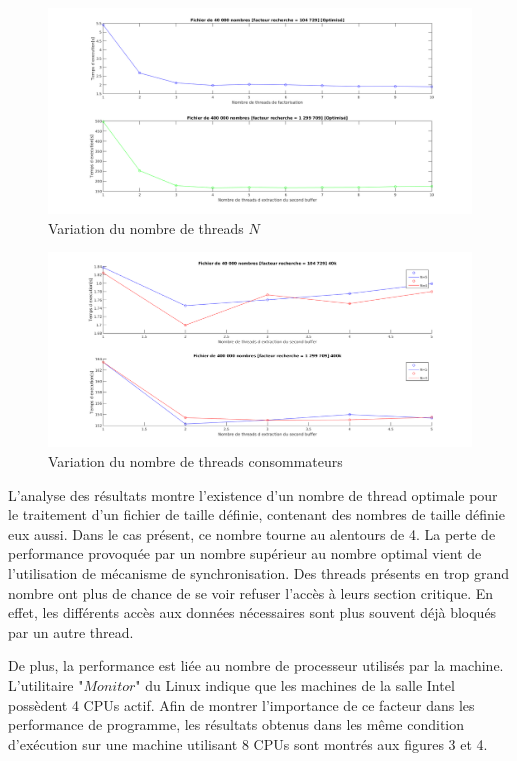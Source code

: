 \documentclass[11pt,a4paper]{article}
\begin{document}
\begin{figure}[ht!]
 \centering
 \includegraphics[scale=0.4]{NanaOpt.png}
 \caption{Variation du nombre de threads $N$}
 \label{schemefig1}
\end{figure}

\begin{figure}[ht!]
 \centering
 \begin{center}
 \includegraphics[scale=0.4]{kanaOpt.png} 
 \end{center}
 \caption{Variation du nombre de threads consommateurs}
 \label{scheme1}
\end{figure}

L'analyse des résultats montre l'existence d'un nombre de thread optimale pour le traitement d'un fichier de taille définie, contenant des nombres de taille définie eux aussi. Dans le cas présent, ce nombre tourne au alentours de 4. La perte de performance provoquée par un nombre supérieur au nombre optimal vient de l'utilisation de mécanisme de synchronisation. Des threads présents en trop grand nombre ont plus de chance de se voir refuser l'accès à leurs section critique. En effet, les différents accès aux données nécessaires sont plus souvent déjà bloqués par un autre thread.

De plus, la performance est liée au nombre de processeur utilisés par la machine. L'utilitaire "$Monitor$" du Linux indique que les machines de la salle Intel possèdent 4 CPUs actif. Afin de montrer l'importance de ce facteur dans les performance de programme, les résultats obtenus dans les même condition d'exécution sur une machine utilisant 8 CPUs sont montrés aux figures 3 et 4.
\end{document}

